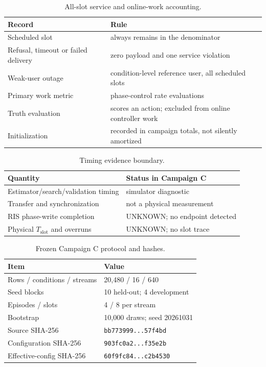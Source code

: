 \documentclass[10pt,twocolumn]{article}
\begin{document}
\begin{table}[t]
\caption{All-slot service and online-work accounting.}
\label{tab:accounting}
\scriptsize
\begin{tabularx}{\columnwidth}{@{}l X@{}}
\toprule
Record & Rule \\
\midrule
Scheduled slot & always remains in the denominator \\
Refusal, timeout or failed delivery & zero payload and one service violation \\
Weak-user outage & condition-level reference user, all scheduled slots \\
Primary work metric & phase-control rate evaluations \\
Truth evaluation & scores an action; excluded from online controller work \\
Initialization & recorded in campaign totals, not silently amortized \\
\bottomrule
\end{tabularx}
\end{table}

\begin{table}[t]
\caption{Timing evidence boundary.}
\label{tab:timing}
\scriptsize
\begin{tabularx}{\columnwidth}{@{}l X@{}}
\toprule
Quantity & Status in Campaign C \\
\midrule
Estimator/search/validation timing & simulator diagnostic \\
Transfer and synchronization & not a physical measurement \\
RIS phase-write completion & UNKNOWN; no endpoint detected \\
Physical $T_{\mathrm{slot}}$ and overruns & UNKNOWN; no slot trace \\
\bottomrule
\end{tabularx}
\end{table}

\begin{table}[t]
\caption{Frozen Campaign C protocol and hashes.}
\label{tab:protocol}
\scriptsize
\begin{tabularx}{\columnwidth}{@{}l X@{}}
\toprule
Item & Value \\
\midrule
Rows / conditions / streams & 20,480 / 16 / 640 \\
Seed blocks & 10 held-out; 4 development \\
Episodes / slots & 4 / 8 per stream \\
Bootstrap & 10,000 draws; seed 20261031 \\
Source SHA-256 & \texttt{bb773999...57f4bd} \\
Configuration SHA-256 & \texttt{903fc0a2...f35e2b} \\
Effective-config SHA-256 & \texttt{60f9fc84...c2b4530} \\
\bottomrule
\end{tabularx}
\end{table}
\end{document}
